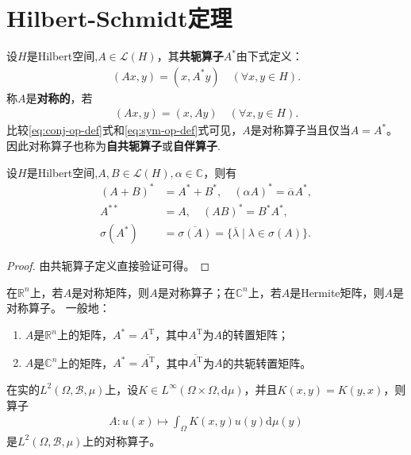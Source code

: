 \documentclass[../../main.tex]{subfiles}%
\begin{document}
\section{Hilbert-Schmidt定理}

\begin{definition}
设$H$是Hilbert空间,$A\in\mathscr{L}(H)$，其\textbf{共轭算子}$A^*$由下式定义：
\begin{align}
(Ax,y)=(x,A^*y)\quad(\forall x,y\in H).\label{eq:conj-op-def}
\end{align}
称$A$是\textbf{对称的}，若
\begin{align}
(Ax,y)=(x,Ay)\quad(\forall x,y\in H).\label{eq:sym-op-def}
\end{align}
比较\eqref{eq:conj-op-def}式和\eqref{eq:sym-op-def}式可见，$A$是对称算子当且仅当$A=A^*$。因此对称算子也称为\textbf{自共轭算子}或\textbf{自伴算子}.
\end{definition}

\begin{proposition}[共轭算子的基本性质]\label{proposition:共轭算子的基本性质}
设$H$是Hilbert空间,$A,B\in\mathscr{L}(H),\alpha\in\mathbb{C}$，则有
\begin{align*}
(A+B)^*&=A^*+B^*,\quad (\alpha A)^*=\overline{\alpha}A^*,\\
A^{**}&=A,\quad (AB)^*=B^*A^*,\\
\sigma(A^*)&=\overline{\sigma(A)}=\{\overline{\lambda}\mid\lambda\in\sigma(A)\}.
\end{align*}
\end{proposition}
\begin{proof}
由共轭算子定义直接验证可得。
\end{proof}

\begin{examples}
在$\mathbb{R}^n$上，若$A$是对称矩阵，则$A$是对称算子；在$\mathbb{C}^n$上，若$A$是Hermite矩阵，则$A$是对称算子。
一般地：
\begin{enumerate}[(1)]
\item $A$是$\mathbb{R}^n$上的矩阵，$A^*=A^\mathrm{T}$，其中$A^\mathrm{T}$为$A$的转置矩阵；

\item $A$是$\mathbb{C}^n$上的矩阵，$A^*=\overline{A^\mathrm{T}}$，其中$\overline{A^\mathrm{T}}$为$A$的共轭转置矩阵。
\end{enumerate}
\end{examples}

\begin{examples}
在实的$L^2(\Omega,\mathscr{B},\mu)$上，设$K\in L^\infty(\Omega\times\Omega,\mathrm{d}\mu)$，并且$K(x,y)=K(y,x)$，则算子
\begin{align*}
A:u(x)\mapsto\int_{\Omega}K(x,y)u(y)\mathrm{d}\mu(y)
\end{align*}
是$L^2(\Omega,\mathscr{B},\mu)$上的对称算子。
\end{examples}
\end{document}
